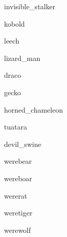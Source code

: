 \documentclass[letterpaper,serif]{module}
\begin{document}
\begin{newmonster}{invisible_stalker}\end{newmonster}

\begin{newmonster}{kobold}\end{newmonster}

\begin{newmonster}{leech}\end{newmonster}

\begin{newmonster}{lizard_man}\end{newmonster}

\begin{newmonster}{draco}\end{newmonster}

\begin{newmonster}{gecko}\end{newmonster}

\begin{newmonster}{horned_chameleon}\end{newmonster}

\begin{newmonster}{tuatara}\end{newmonster}

\begin{newmonster}{devil_swine}\end{newmonster}

\begin{newmonster}{werebear}\end{newmonster}

\begin{newmonster}{wereboar}\end{newmonster}

\begin{newmonster}{wererat}\end{newmonster}

\begin{newmonster}{weretiger}\end{newmonster}

\begin{newmonster}{werewolf}\end{newmonster}
\end{document}
